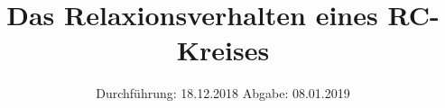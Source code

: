 

\subject{Nr. 353}
\title{Das Relaxionsverhalten eines RC-Kreises}
\date{%
  Durchführung: 18.12.2018
  \hspace{3em}
  Abgabe: 08.01.2019
}



\maketitle
\thispagestyle{empty}
\tableofcontents
\newpage






\printbibliography{}


